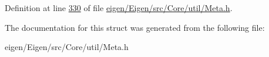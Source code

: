 Definition at line \hyperlink{eigen_2_eigen_2src_2_core_2util_2_meta_8h_source_l00330}{330} of file \hyperlink{eigen_2_eigen_2src_2_core_2util_2_meta_8h_source}{eigen/\+Eigen/src/\+Core/util/\+Meta.\+h}.



The documentation for this struct was generated from the following file\+:\begin{DoxyCompactItemize}
\item 
eigen/\+Eigen/src/\+Core/util/\+Meta.\+h\end{DoxyCompactItemize}
